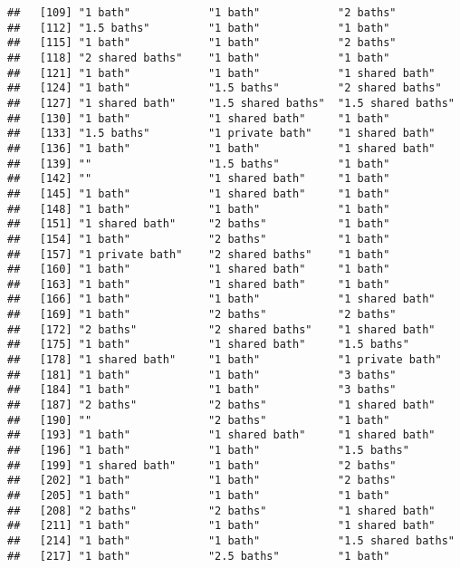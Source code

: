 \documentclass[
]{article}
\begin{document}
\begin{verbatim}
##   [109] "1 bath"            "1 bath"            "2 baths"          
##   [112] "1.5 baths"         "1 bath"            "1 bath"           
##   [115] "1 bath"            "1 bath"            "2 baths"          
##   [118] "2 shared baths"    "1 bath"            "1 bath"           
##   [121] "1 bath"            "1 bath"            "1 shared bath"    
##   [124] "1 bath"            "1.5 baths"         "2 shared baths"   
##   [127] "1 shared bath"     "1.5 shared baths"  "1.5 shared baths" 
##   [130] "1 bath"            "1 shared bath"     "1 bath"           
##   [133] "1.5 baths"         "1 private bath"    "1 shared bath"    
##   [136] "1 bath"            "1 bath"            "1 shared bath"    
##   [139] ""                  "1.5 baths"         "1 bath"           
##   [142] ""                  "1 shared bath"     "1 bath"           
##   [145] "1 bath"            "1 shared bath"     "1 bath"           
##   [148] "1 bath"            "1 bath"            "1 bath"           
##   [151] "1 shared bath"     "2 baths"           "1 bath"           
##   [154] "1 bath"            "2 baths"           "1 bath"           
##   [157] "1 private bath"    "2 shared baths"    "1 bath"           
##   [160] "1 bath"            "1 shared bath"     "1 bath"           
##   [163] "1 bath"            "1 shared bath"     "1 bath"           
##   [166] "1 bath"            "1 bath"            "1 shared bath"    
##   [169] "1 bath"            "2 baths"           "2 baths"          
##   [172] "2 baths"           "2 shared baths"    "1 shared bath"    
##   [175] "1 bath"            "1 shared bath"     "1.5 baths"        
##   [178] "1 shared bath"     "1 bath"            "1 private bath"   
##   [181] "1 bath"            "1 bath"            "3 baths"          
##   [184] "1 bath"            "1 bath"            "3 baths"          
##   [187] "2 baths"           "2 baths"           "1 shared bath"    
##   [190] ""                  "2 baths"           "1 bath"           
##   [193] "1 bath"            "1 shared bath"     "1 shared bath"    
##   [196] "1 bath"            "1 bath"            "1.5 baths"        
##   [199] "1 shared bath"     "1 bath"            "2 baths"          
##   [202] "1 bath"            "1 bath"            "2 baths"          
##   [205] "1 bath"            "1 bath"            "1 bath"           
##   [208] "2 baths"           "2 baths"           "1 shared bath"    
##   [211] "1 bath"            "1 bath"            "1 shared bath"    
##   [214] "1 bath"            "1 bath"            "1.5 shared baths" 
##   [217] "1 bath"            "2.5 baths"         "1 bath"           

\end{verbatim}
\end{document}

